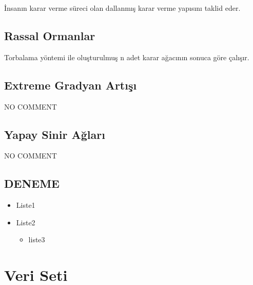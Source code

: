 \documentclass[12pt,twoside]{deuthesis}
\providecommand{\tightlist}{%
  \setlength{\itemsep}{0pt}\setlength{\parskip}{0pt}}
\begin{document}
İnsanın karar verme süreci olan dallanmış karar verme yapısını taklid eder.

\hypertarget{random_forest}{%
\section{Rassal Ormanlar}\label{random_forest}}

Torbalama yöntemi ile oluşturulmuş n adet karar ağacının sonuca göre çalışır.

\hypertarget{xgboost}{%
\section{Extreme Gradyan Artışı}\label{xgboost}}

NO COMMENT

\hypertarget{nn}{%
\section{Yapay Sinir Ağları}\label{nn}}

NO COMMENT

\hypertarget{deneme}{%
\section{DENEME}\label{deneme}}
\begin{itemize}
\tightlist
\item
  Liste1
\item
  Liste2
  \begin{itemize}
  \tightlist
  \item
    liste3
  \end{itemize}
\end{itemize}
\hypertarget{veri_seti}{%
\chapter{Veri Seti}\label{veri_seti}}
\end{document}
